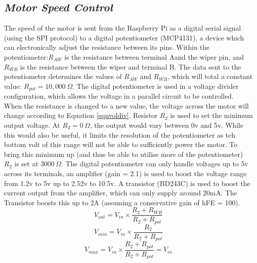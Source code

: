 \documentclass[twoside,a4]{report}
\begin{document}
	\subsection{\textit{Motor Speed Control}} %
	The speed of the motor is sent from the Raspberry Pi as a digital serial signal (using the SPI protocol) to a digital potentiometer (MCP4131), a device which can electronically adjust the resistance between its pins. Within the potentiometer:\(R_{AW}\) is the resistance between terminal Aand the wiper pin, and \(R_{WB}\) is the resistance between the wiper and terminal B. The data sent to the potentiometer determines the values of \(R_{AW}\) and \(R_{WB}\), which will total a constant value: \(R_{pot} = 10,000\ \Omega \). The digital potentiometer is used in a voltage divider configuration, which allows the voltage in a parallel circuit to be controlled. When the resistance is changed to a new value, the voltage across the motor will change according to Equation \ref{eqnvoldiv}. Resistor \(R_2\) is used to set the minimum output voltage. At \(R_2 = 0\ \Omega\), the output would vary between 0v and 5v. While this would also be useful, it limits the resolution of the potentiometer as teh bottom volt of this range will not be able to sufficiently power the motor. To bring this minimum up (and thus be able to utilise more of the potentiometer) \(R_2\) is set at \(3000\ \Omega \). The digital potentiometer can only handle voltages up to 5v across its terminals, an amplifier (gain = 2.1) is used to boost the voltage range from 1.2v to 5v up to 2.52v to 10.5v. A transistor (BD243C) is used to boost the current output from the amplifier, which can only supply around 20mA. The Transistor boosts this up to 2A (assuming a conservative gain of hFE = 100).
	\begin{equation}
		V_{out} = V_{in}\times \frac{R_2 + R_{WB}}{R_2 + R_{pot}}
		\label{eqnvoldiv}
	\end{equation}\newline
	\begin{equation}
		V_{min} = V_{in}\times \frac{R_2}{R_2 + R_{pot}}
		\label{eqnminvol}
	\end{equation}\newline
	\begin{equation}
		V_{max} = V_{in}\times \frac{R_2 + R_{pot}}{R_2 + R_{pot}} = V_{in}
		\label{eqnmaxvol}
	\end{equation}\newline \noindent
\end{document}
